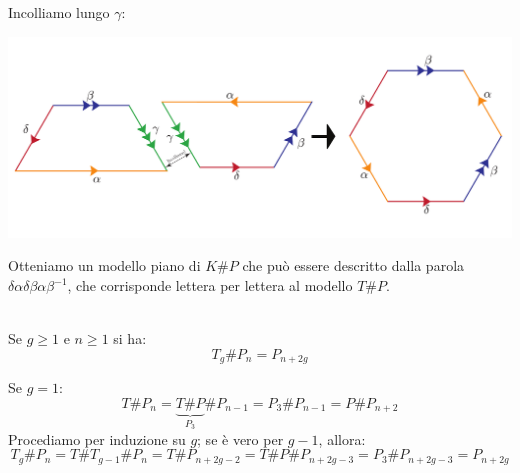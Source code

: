\begin{demonstration}
\begin{center}
\end{center}
Incolliamo lungo $\gamma$:
\begin{center}
	\includegraphics[trim=0cm 0cm 0cm 0cm, clip, scale=0.3]{images/kleinplusproj2.pdf}
\end{center}
Otteniamo un modello piano di $K\# P$ che può essere descritto dalla parola $\delta \alpha \delta\beta\alpha\beta^{-1}$, che corrisponde lettera per lettera al modello $T\# P$.
\end{demonstration}
\begin{corollary}~{}\\\label{toropiupiano}
Se $g\geq 1$ e $n\geq 1$ si ha:
\begin{equation}
	T_g\# P_n=P_{n+2g}
\end{equation}
\vspace{-6mm}
\end{corollary}
\begin{demonstration}
	Se $g=1$:
	\begin{equation*}
		T\# P_n=\underbrace{T\# P}_{P_3}\# P_{n-1}=P_3\# P_{n-1}=P\# P_{n+2}
	\end{equation*}
Procediamo per induzione su $g$; se è vero per $g-1$, allora:
\begin{equation*}
	T_g\# P_n=T\# T_{g-1}\# P_n=T\# P_{n+2g-2}=T\# P\# P_{n+2g-3}=P_3\# P_{n+2g-3}=P_{n+2g}
\end{equation*}
\end{demonstration}
